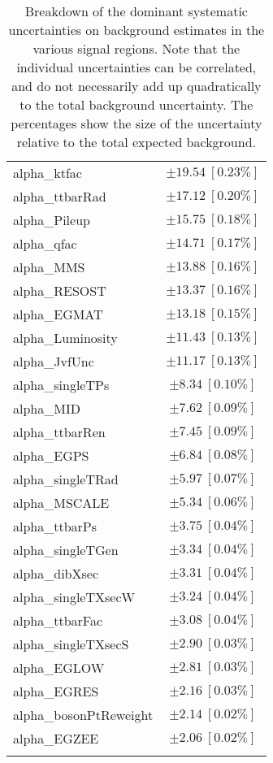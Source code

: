 \begin{table}
\begin{center}
\begin{tabular*}{\textwidth}{@{\extracolsep{\fill}}lc}
alpha\_ktfac         & $\pm 19.54\ [0.23\%] $       \\
alpha\_ttbarRad         & $\pm 17.12\ [0.20\%] $       \\
alpha\_Pileup         & $\pm 15.75\ [0.18\%] $       \\
alpha\_qfac         & $\pm 14.71\ [0.17\%] $       \\
alpha\_MMS         & $\pm 13.88\ [0.16\%] $       \\
alpha\_RESOST         & $\pm 13.37\ [0.16\%] $       \\
alpha\_EGMAT         & $\pm 13.18\ [0.15\%] $       \\
alpha\_Luminosity         & $\pm 11.43\ [0.13\%] $       \\
alpha\_JvfUnc         & $\pm 11.17\ [0.13\%] $       \\
alpha\_singleTPs         & $\pm 8.34\ [0.10\%] $       \\
alpha\_MID         & $\pm 7.62\ [0.09\%] $       \\
alpha\_ttbarRen         & $\pm 7.45\ [0.09\%] $       \\
alpha\_EGPS         & $\pm 6.84\ [0.08\%] $       \\
alpha\_singleTRad         & $\pm 5.97\ [0.07\%] $       \\
alpha\_MSCALE         & $\pm 5.34\ [0.06\%] $       \\
alpha\_ttbarPs         & $\pm 3.75\ [0.04\%] $       \\
alpha\_singleTGen         & $\pm 3.34\ [0.04\%] $       \\
alpha\_dibXsec         & $\pm 3.31\ [0.04\%] $       \\
alpha\_singleTXsecW         & $\pm 3.24\ [0.04\%] $       \\
alpha\_ttbarFac         & $\pm 3.08\ [0.04\%] $       \\
alpha\_singleTXsecS         & $\pm 2.90\ [0.03\%] $       \\
alpha\_EGLOW         & $\pm 2.81\ [0.03\%] $       \\
alpha\_EGRES         & $\pm 2.16\ [0.03\%] $       \\
alpha\_bosonPtReweight         & $\pm 2.14\ [0.02\%] $       \\
alpha\_EGZEE         & $\pm 2.06\ [0.02\%] $       \\
\noalign{\smallskip}\hline\noalign{\smallskip}
\end{tabular*}
\end{center}
\caption[Breakdown of uncertainty on background estimates]{
Breakdown of the dominant systematic uncertainties on background estimates in the various signal regions.
Note that the individual uncertainties can be correlated, and do not necessarily add up quadratically to 
the total background uncertainty. The percentages show the size of the uncertainty relative to the total expected background.
\label{table.results.bkgestimate.uncertainties.SR}}
\end{table}
%